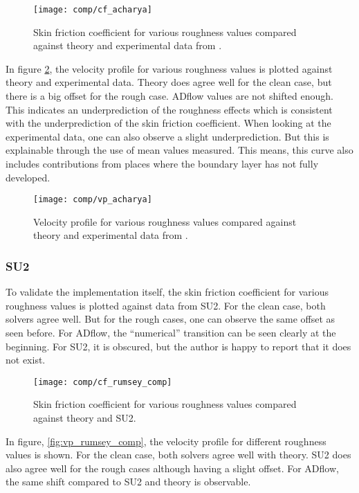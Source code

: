 \begin{figure}[H] \centering
  \texttt{[image: comp/cf\_acharya]}
    \caption{Skin friction coefficient for various roughness values compared
      against theory and experimental data from \cite{Acharya1986}.}
    \label{fig:cf_acharya}
\end{figure}

\noindent In figure \ref{fig:vp_acharya}, the velocity profile for various
roughness values is plotted against theory and experimental data. Theory does
agree well for the clean case, but there is a big offset for the rough case.
ADflow values are not shifted enough. This indicates an underprediction of the
roughness effects which is consistent with the underprediction of the skin
friction coefficient. When looking at the experimental data, one can also
observe a slight underprediction. But this is explainable through the use of
mean values measured. This means, this curve also includes contributions from
places where the boundary layer has not fully developed.

\begin{figure}[H] \centering
  \texttt{[image: comp/vp\_acharya]}
    \caption{Velocity profile for various roughness values compared
      against theory and experimental data from \cite{Acharya1986}.}
    \label{fig:vp_acharya}
\end{figure}



\subsubsection{SU2}
To validate the implementation itself, the skin friction coefficient for various
roughness values is plotted against data from SU2. For the clean case, both
solvers agree well. But for the rough cases, one can observe the same offset as
seen before. For ADflow, the ``numerical'' transition can be seen clearly at the
beginning. For SU2, it is obscured, but the author is happy to report that it
does not exist.

\begin{figure}[H] \centering
  \texttt{[image: comp/cf\_rumsey\_comp]}
    \caption{Skin friction coefficient for various roughness values compared
      against theory and SU2.}
    \label{fig:cf_rumsey_comp}
\end{figure}

\noindent In figure, \ref{fig:vp_rumsey_comp}, the velocity profile for
different roughness values is shown. For the clean case, both solvers agree well
with theory. SU2 does also agree well for the rough cases although having a
slight offset. For ADflow, the same shift compared to SU2 and theory is
observable.

